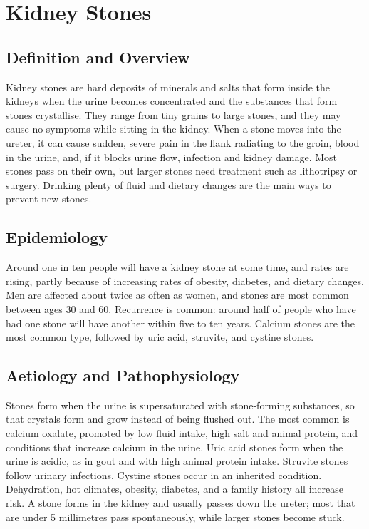 \chapter{Kidney Stones}

\section*{Definition and Overview}
Kidney stones are hard deposits of minerals and salts that form inside the kidneys when the urine becomes concentrated and the substances that form stones crystallise. They range from tiny grains to large stones, and they may cause no symptoms while sitting in the kidney. When a stone moves into the ureter, it can cause sudden, severe pain in the flank radiating to the groin, blood in the urine, and, if it blocks urine flow, infection and kidney damage. Most stones pass on their own, but larger stones need treatment such as lithotripsy or surgery. Drinking plenty of fluid and dietary changes are the main ways to prevent new stones.

\section*{Epidemiology}
Around one in ten people will have a kidney stone at some time, and rates are rising, partly because of increasing rates of obesity, diabetes, and dietary changes. Men are affected about twice as often as women, and stones are most common between ages 30 and 60. Recurrence is common: around half of people who have had one stone will have another within five to ten years. Calcium stones are the most common type, followed by uric acid, struvite, and cystine stones.

\section*{Aetiology and Pathophysiology}
Stones form when the urine is supersaturated with stone-forming substances, so that crystals form and grow instead of being flushed out. The most common is calcium oxalate, promoted by low fluid intake, high salt and animal protein, and conditions that increase calcium in the urine. Uric acid stones form when the urine is acidic, as in gout and with high animal protein intake. Struvite stones follow urinary infections. Cystine stones occur in an inherited condition. Dehydration, hot climates, obesity, diabetes, and a family history all increase risk. A stone forms in the kidney and usually passes down the ureter; most that are under 5 millimetres pass spontaneously, while larger stones become stuck.

